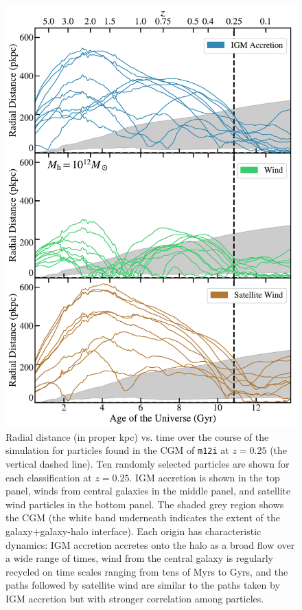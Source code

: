 \documentclass[fleqn,usenatbib]{mnras}
\begin{document}
\begin{figure}
\includegraphics[width=\columnwidth]{figures/r_vs_time_m12i_CGM_snum465_galdefv3.pdf}
\caption{
Radial distance (in proper kpc) vs. time over the course of the simulation for particles found in the CGM of \texttt{m12i} at $z=0.25$  (the vertical dashed line).
Ten randomly selected particles are shown for each classification at $z=0.25$. 
IGM accretion is shown in the top panel, winds from central galaxies in the middle panel, and satellite wind particles in the bottom panel.
The shaded grey region shows the CGM (the white band underneath indicates the extent of the galaxy+galaxy-halo interface).
Each origin has characteristic dynamics: 
IGM accretion accretes onto the halo as a broad flow over a wide range of times,
wind from the central galaxy is regularly recycled on time scales ranging from tens of Myrs to Gyrs, and the paths followed by satellite wind are similar to the paths taken by IGM accretion but with stronger correlation among particles.
}
\label{fig:r_vs_time_m12i_CGM_snum465}
\end{figure}
\end{document}
